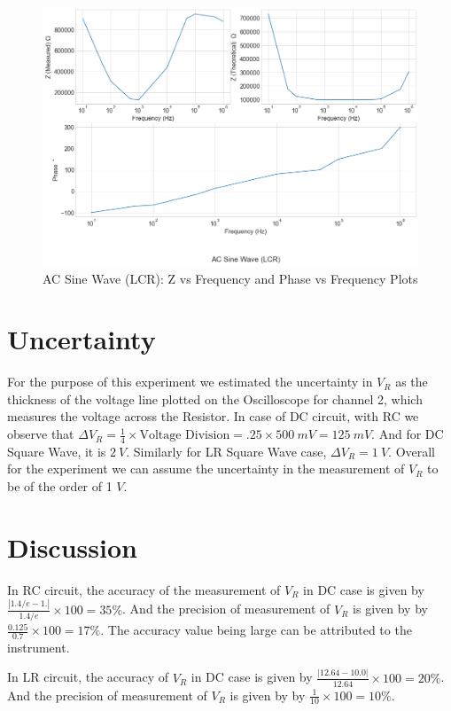 \documentclass[a4paper,12pt]{article}
\begin{document}
\begin{figure}[H]
  \centering
  \includegraphics[width=0.8\linewidth]{../code/AC Sine Wave (LCR).png}    
    \caption{AC Sine Wave (LCR): Z vs Frequency and Phase vs Frequency Plots}
    \label{Combined_LCR_AC}
\end{figure}

\section{Uncertainty}

For the purpose of this experiment we estimated the uncertainty in $V_R$
as the thickness of the voltage line plotted on the Oscilloscope for channel 2, which 
measures the voltage across the Resistor. In case of DC circuit, with RC we observe that 
$\Delta V_R = \frac{1}{4} \times \text{Voltage Division} = .25 \times 500\ mV = 125\ mV$. 
And for DC Square Wave, it is $2\ V$. Similarly for LR Square Wave case, $\Delta V_R = 1\ V$.
Overall for the experiment we  can assume the uncertainty in the measurement of $V_R$ to be 
of the order of 1 $V$.

\section{Discussion}

In RC circuit, the accuracy of the measurement of $V_R$ in DC case is given by $\frac{|1.4/e - 1.|}{1.4/e} \times 100 = 35 \%$. 
And the precision of measurement of $V_R$ is  given by by $\frac{0.125}{0.7} \times 100 = 17 \%$. 
The accuracy value being  large can be attributed to  the  instrument.

In LR circuit, the accuracy of $V_R$ in DC case is given by $\frac{|12.64 - 10.0|}{12.64} \times 100 = 20 \%$. 
And the precision of measurement of $V_R$ is  given by by $\frac{1}{10} \times 100 = 10 \%$. 
\end{document}
